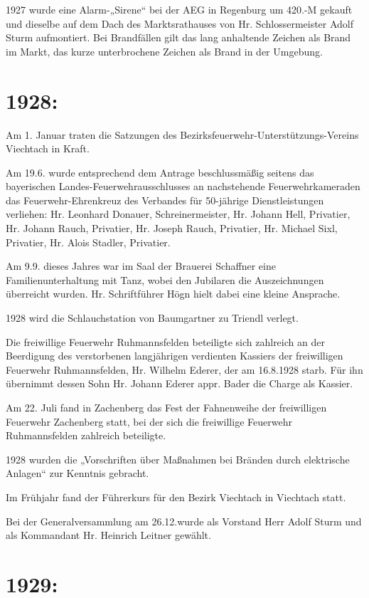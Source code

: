 \documentclass[12pt,a4paper]{book}
\begin{document}
1927 wurde eine Alarm-„Sirene“ bei der AEG in Regenburg um 420.-M gekauft und
dieselbe auf dem Dach des Marktsrathauses von Hr. Schlossermeister Adolf Sturm
aufmontiert. Bei Brandfällen gilt das lang anhaltende Zeichen als Brand im
Markt, das kurze unterbrochene Zeichen als Brand in der Umgebung.

\section{1928:}

Am 1. Januar traten die Satzungen des Bezirksfeuerwehr-Unterstützungs-Vereins
Viechtach in Kraft.

Am 19.6. wurde entsprechend dem Antrage beschlussmäßig seitens das bayerischen
Landes-Feuerwehrausschlusses an nachstehende Feuerwehrkameraden das
Feuerwehr-Ehrenkreuz des Verbandes für 50-jährige Dienstleistungen verliehen:
Hr. Leonhard Donauer, Schreinermeister, Hr. Johann Hell, Privatier, Hr. Johann
Rauch, Privatier, Hr. Joseph Rauch, Privatier, Hr. Michael Sixl, Privatier, Hr.
Alois Stadler, Privatier.

Am 9.9. dieses Jahres war im Saal der Brauerei Schaffner eine
Familienunterhaltung mit Tanz, wobei den Jubilaren die Auszeichnungen überreicht
wurden. Hr. Schriftführer Högn hielt dabei eine kleine Ansprache.

1928 wird die Schlauchstation von Baumgartner zu Triendl verlegt.

Die freiwillige Feuerwehr Ruhmannsfelden beteiligte sich zahlreich an der
Beerdigung des verstorbenen langjährigen verdienten Kassiers der freiwilligen
Feuerwehr Ruhmannsfelden, Hr. Wilhelm Ederer, der am 16.8.1928 starb. Für ihn
übernimmt dessen Sohn Hr. Johann Ederer appr. Bader die Charge als Kassier.

Am 22. Juli fand in Zachenberg das Fest der Fahnenweihe der freiwilligen
Feuerwehr Zachenberg statt, bei der sich die freiwillige Feuerwehr
Ruhmannsfelden zahlreich beteiligte.

1928 wurden die „Vorschriften über Maßnahmen bei Bränden durch elektrische
Anlagen“ zur Kenntnis gebracht.

Im Frühjahr fand der Führerkurs für den Bezirk Viechtach in Viechtach statt.

Bei der Generalversammlung am 26.12.wurde als Vorstand Herr Adolf Sturm und als
Kommandant Hr. Heinrich Leitner gewählt.

\section{1929:}
\end{document}
